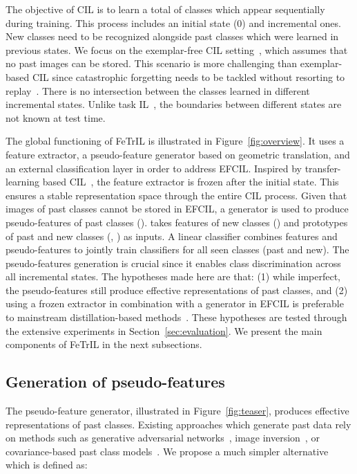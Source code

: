 \documentclass[10pt,twocolumn,letterpaper]{article}
\makeatletter
\newcommand{\ourmodel}{FeTrIL\@\xspace}
\makeatother
\begin{document}
The objective of CIL is to learn a total of  classes which appear sequentially during training. 
This process includes an initial state (0) and  incremental ones. 
New classes need to be recognized alongside past classes which were learned in previous states.
We focus on the exemplar-free CIL setting~\cite{rebuffi2017_icarl,smith2021always,sdc_2020,zhu2022self}, which assumes that no past images can be stored.
This scenario is more challenging than exemplar-based CIL since catastrophic forgetting needs to be tackled without resorting to replay~\cite{masana2021_study}. 
There is no intersection between the classes learned in different incremental states.
Unlike task IL~\cite{van2019three}, the boundaries between different states are not known at test time. 

The global functioning of \ourmodel is illustrated in Figure~\ref{fig:overview}. 
It uses a feature extractor, a pseudo-feature generator based on geometric translation, and an external classification layer in order to address EFCIL.
Inspired by transfer-learning based CIL~\cite{belouadah2018_deesil,rebuffi2017_icarl}, the feature extractor  is frozen after the initial state.
This ensures a stable representation space through the entire CIL process. 
Given that images of past classes cannot be stored in EFCIL, a generator  is used to produce pseudo-features of past classes ().
 takes features of new classes () and prototypes of past and new classes (, ) as inputs. 
A linear classifier  combines features and pseudo-features to jointly train classifiers for all seen classes (past and new). 
The pseudo-features generation is crucial since it enables class discrimination across all incremental states.
The hypotheses made here are that: 
(1) while imperfect, the pseudo-features still produce effective representations of past classes,
and
(2) using a frozen extractor in combination with a generator in EFCIL is preferable to mainstream distillation-based methods~\cite{sdc_2020,zhu2021class,zhu2021pass,zhu2022self}.
These hypotheses are tested through the extensive experiments in Section~\ref{sec:evaluation}.
We present the main components of \ourmodel in the next subsections. 

\subsection{Generation of pseudo-features}
\label{subsec:gen}
The pseudo-feature generator, illustrated in Figure~\ref{fig:teaser}, produces effective representations of past classes.
Existing approaches which generate past data rely on methods such as generative adversarial networks~\cite{he2018_generative}, image inversion~\cite{smith2021always}, or covariance-based past class models~\cite{zhu2021class}.
We propose a much simpler alternative which is defined as: \vspace{-2mm}
\end{document}
